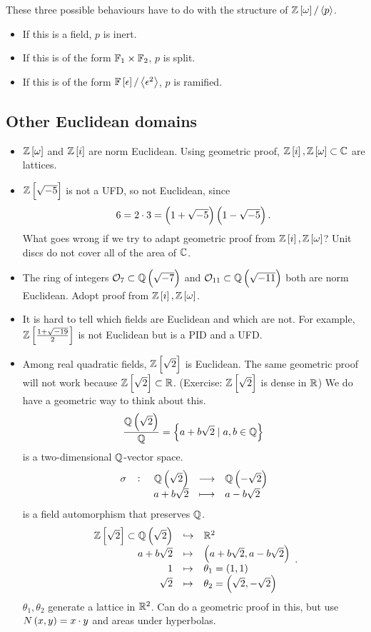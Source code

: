 \begin{remark*}
These three possible behaviours have to do with the structure of $ \Z\sbr{\omega} / \abr{p} $.
\begin{itemize}
\item If this is a field, $ p $ is inert.
\item If this is of the form $ \mathbb{F}_1 \times \mathbb{F}_2 $, $ p $ is split.
\item If this is of the form $ \F\sbr{\epsilon} / \abr{\epsilon^2} $, $ p $ is ramified.
\end{itemize}
\end{remark*}

\pagebreak

\subsection{Other Euclidean domains}

\begin{itemize}
\item $ \Z\sbr{\omega} $ and $ \Z\sbr{i} $ are norm Euclidean. Using geometric proof, $ \Z\sbr{i}, \Z\sbr{\omega} \subset \C $ are lattices.
\item $ \Z\sbr{\sqrt{-5}} $ is not a UFD, so not Euclidean, since
$$ 6 = 2 \cdot 3 = \br{1 + \sqrt{-5}}\br{1 - \sqrt{-5}}. $$
What goes wrong if we try to adapt geometric proof from $ \Z\sbr{i}, \Z\sbr{\omega} $? Unit discs do not cover all of the area of $ \mathbb{C} $.
\item The ring of integers $ \OO_7 \subset \Q\br{\sqrt{-7}} $ and $ \OO_{11} \subset \Q\br{\sqrt{-11}} $ both are norm Euclidean. Adopt proof from $ \Z\sbr{i}, \Z\sbr{\omega} $.
\item It is hard to tell which fields are Euclidean and which are not. For example, $ \Z\sbr{\tfrac{1 + \sqrt{-19}}{2}} $ is not Euclidean but is a PID and a UFD.
\item Among real quadratic fields, $ \Z\sbr{\sqrt{2}} $ is Euclidean. The same geometric proof will not work because $ \Z\sbr{\sqrt{2}} \subset \R $. (Exercise: $ \Z\sbr{\sqrt{2}} $ is dense in $ \mathbb{R} $) We do have a geometric way to think about this.
$$ \dfrac{\Q\br{\sqrt{2}}}{\Q} = \cbr{a + b\sqrt{2} \mid a, b \in \Q} $$
is a two-dimensional $ \mathbb{Q} $-vector space.
$$ \function[\sigma]{\Q\br{\sqrt{2}}}{\Q\br{-\sqrt{2}}}{a + b\sqrt{2}}{a - b\sqrt{2}} $$
is a field automorphism that preserves $ \mathbb{Q} $.
$$
\begin{array}{rcl}
\Z\sbr{\sqrt{2}} \subset \Q\br{\sqrt{2}} & \hookrightarrow & \R^2 \\
a + b\sqrt{2} & \mapsto & \br{a + b\sqrt{2}, a - b\sqrt{2}} \\
1 & \mapsto & \theta_1 = \br{1, 1} \\
\sqrt{2} & \mapsto & \theta_2 = \br{\sqrt{2}, -\sqrt{2}}
\end{array}.
$$
$ \theta_1, \theta_2 $ generate a lattice in $ \mathbb{R}^2 $. Can do a geometric proof in this, but use $ N\br{x, y} = x \cdot y $ and areas under hyperbolas.
\end{itemize}

